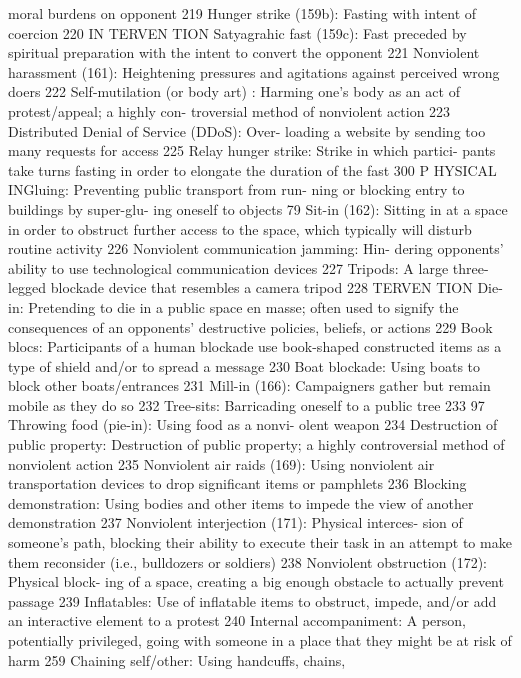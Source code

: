 \documentclass[twoside,a4paper,12pt,fleqn,openany]{extbook}
\begin{document}
moral burdens on opponent
 219
Hunger strike (159b): Fasting with intent of
coercion
 220
IN TERVEN TION
Satyagrahic fast (159c): Fast preceded by
spiritual preparation with the intent to convert
the opponent
 221
Nonviolent harassment (161): Heightening
pressures and agitations against perceived
wrong doers
 222
Self-mutilation (or body art) : Harming one’s
body as an act of protest/appeal; a highly con-
troversial method of nonviolent action
 223
Distributed Denial of Service (DDoS): Over-
loading a website by sending too many requests
for access
 225
Relay hunger strike: Strike in which partici-
pants take turns fasting in order to elongate
the duration of the fast
 300
P HYSICAL INGluing: Preventing public transport from run-
ning or blocking entry to buildings by super-glu-
ing oneself to objects
 79
Sit-in (162): Sitting in at a space in order to
obstruct further access to the space, which
typically will disturb routine activity
 226
Nonviolent communication jamming: Hin-
dering opponents’ ability to use technological
communication devices
 227
Tripods: A large three-legged blockade device
that resembles a camera tripod
 228
TERVEN TION
Die-in: Pretending to die in a public space en
masse; often used to signify the consequences
of an opponents’ destructive policies, beliefs,
or actions
 229
Book blocs: Participants of a human blockade
use book-shaped constructed items as a type
of shield and/or to spread a message
 230
Boat blockade: Using boats to block other
boats/entrances
 231
Mill-in (166): Campaigners gather but remain
mobile as they do so
 232
Tree-sits: Barricading oneself to a public
tree
 233
97
Throwing food (pie-in): Using food as a nonvi-
olent weapon
 234
Destruction of public property: Destruction of
public property; a highly controversial method
of nonviolent action
 235
Nonviolent air raids (169): Using nonviolent air
transportation devices to drop significant items
or pamphlets
 236
Blocking demonstration: Using bodies and
other items to impede the view of another
demonstration
 237
Nonviolent interjection (171): Physical interces-
sion of someone’s path, blocking their ability to
execute their task in an attempt to make them
reconsider (i.e., bulldozers or soldiers)
 238
Nonviolent obstruction (172): Physical block-
ing of a space, creating a big enough obstacle
to actually prevent passage
 239
Inflatables: Use of inflatable items to obstruct,
impede, and/or add an interactive element to
a protest
 240
Internal accompaniment: A person, potentially
privileged, going with someone in a place that
they might be at risk of harm
 259
Chaining self/other: Using handcuffs, chains,
\end{document}
